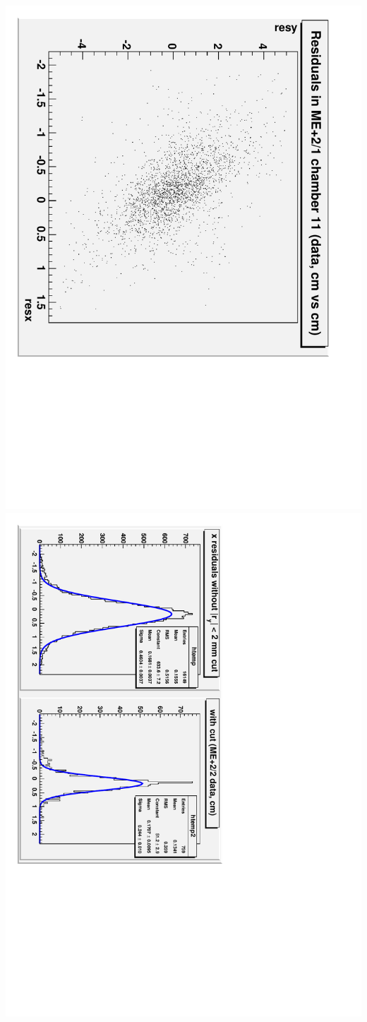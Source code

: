 \documentclass[compress]{beamer}
\begin{document}
\begin{frame}
\vfill
\begin{columns}
\includegraphics[height=\linewidth, angle=90]{data_residuals_ME21.pdf}
\includegraphics[height=\linewidth, angle=90]{data_residuals_detail2-xprojection-fits_ME22.pdf}
\end{columns}
\end{frame}
\end{document}
